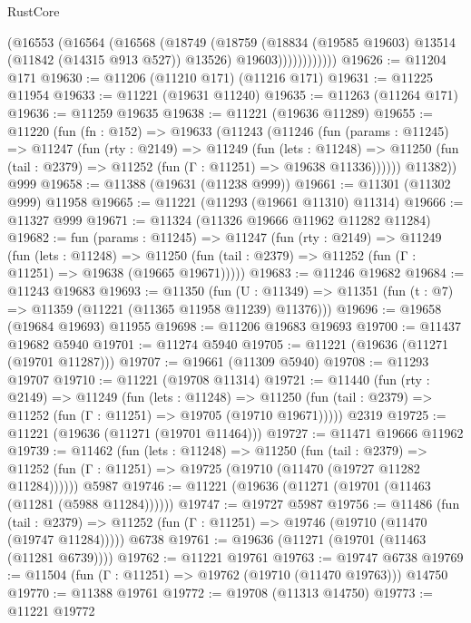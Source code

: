\begin{lexlean}{RustCore}
\begin{coremodule}
                  (@16553
                    (@16564
                      (@16568
                        (@18749
                          (@18759
                            (@18834 (@19585 @19603) @13514 (@11842 (@14315 @913 @527)) @13526)
                            @19603))))))))))))
@19626 := @11204 @171
@19630 := @11206 (@11210 @171) (@11216 @171)
@19631 := @11225 @11954
@19633 := @11221 (@19631 @11240)
@19635 := @11263 (@11264 @171)
@19636 := @11259 @19635
@19638 := @11221 (@19636 @11289)
@19655 := @11220
    (fun (fn : @152) =>
    @19633
      (@11243
        (@11246
          (fun (params : @11245) =>
          @11247
            (fun (rty : @2149) =>
            @11249
              (fun (lets : @11248) =>
              @11250 (fun (tail : @2379) => @11252 (fun (Γ : @11251) => @19638 @11336))))))
        @11382))
    @999
@19658 := @11388 (@19631 (@11238 @999))
@19661 := @11301 (@11302 @999) @11958
@19665 := @11221 (@11293 (@19661 @11310) @11314)
@19666 := @11327 @999
@19671 := @11324 (@11326 @19666 @11962 @11282 @11284)
@19682 := fun (params : @11245) =>
  @11247
    (fun (rty : @2149) =>
    @11249
      (fun (lets : @11248) =>
      @11250 (fun (tail : @2379) => @11252 (fun (Γ : @11251) => @19638 (@19665 @19671)))))
@19683 := @11246 @19682
@19684 := @11243 @19683
@19693 := @11350
    (fun (U : @11349) => @11351 (fun (t : @7) => @11359 (@11221 (@11365 @11958 @11239) @11376)))
@19696 := @19658 (@19684 @19693) @11955
@19698 := @11206 @19683 @19693
@19700 := @11437 @19682 @5940
@19701 := @11274 @5940
@19705 := @11221 (@19636 (@11271 (@19701 @11287)))
@19707 := @19661 (@11309 @5940)
@19708 := @11293 @19707
@19710 := @11221 (@19708 @11314)
@19721 := @11440
    (fun (rty : @2149) =>
    @11249
      (fun (lets : @11248) =>
      @11250 (fun (tail : @2379) => @11252 (fun (Γ : @11251) => @19705 (@19710 @19671)))))
    @2319
@19725 := @11221 (@19636 (@11271 (@19701 @11464)))
@19727 := @11471 @19666 @11962
@19739 := @11462
    (fun (lets : @11248) =>
    @11250
      (fun (tail : @2379) =>
      @11252 (fun (Γ : @11251) => @19725 (@19710 (@11470 (@19727 @11282 @11284))))))
    @5987
@19746 := @11221 (@19636 (@11271 (@19701 (@11463 (@11281 (@5988 @11284))))))
@19747 := @19727 @5987
@19756 := @11486
    (fun (tail : @2379) => @11252 (fun (Γ : @11251) => @19746 (@19710 (@11470 (@19747 @11284)))))
    @6738
@19761 := @19636 (@11271 (@19701 (@11463 (@11281 @6739))))
@19762 := @11221 @19761
@19763 := @19747 @6738
@19769 := @11504 (fun (Γ : @11251) => @19762 (@19710 (@11470 @19763))) @14750
@19770 := @11388 @19761
@19772 := @19708 (@11313 @14750)
@19773 := @11221 @19772

\end{coremodule}
\end{lexlean}
